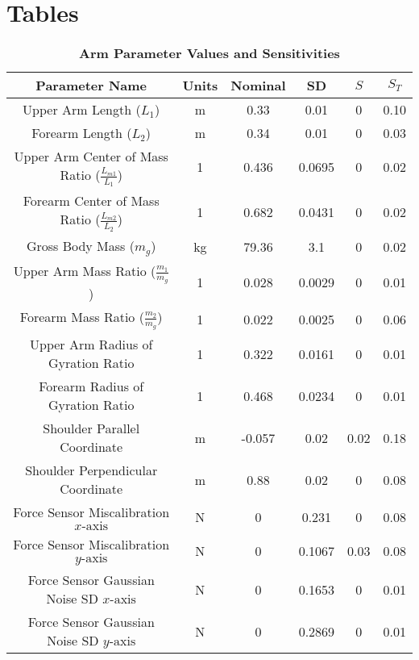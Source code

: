 \documentclass[10pt]{article}
\begin{document}
\section*{Tables}

\begin{table}[!ht]
\caption{
\bf{Arm Parameter Values and Sensitivities}}
\begin{tabular}{|c|c|c c|c c|}
\hline
Parameter Name &
Units &
Nominal &
SD &
$S$ &
$S_T$ \\ \hline
Upper Arm Length ($L_1$) &
m &
0.33 &
0.01 &
0 &
0.10 \\
Forearm Length ($L_2$) &
m &
0.34 &
0.01 &
0 &
0.03 \\
Upper Arm Center of Mass Ratio ($\frac{L_{m1}}{L_1}$) &
1 &
0.436 &
0.0695 &
0 &
0.02 \\
Forearm Center of Mass Ratio ($\frac{L_{m2}}{L_2}$) &
1 &
0.682 &
0.0431 &
0 &
0.02 \\
Gross Body Mass ($m_g$) &
kg &
79.36 &
3.1 &
0 &
0.02 \\
Upper Arm Mass Ratio ($\frac{m_1}{m_g}$) &
1 &
0.028 &
0.0029 &
0 &
0.01 \\
Forearm Mass Ratio ($\frac{m_2}{m_g}$) &
1 &
0.022 &
0.0025 &
0 &
0.06 \\
Upper Arm Radius of Gyration Ratio &
1 &
0.322 &
0.0161 &
0 &
0.01 \\
Forearm Radius of Gyration Ratio &
1 &
0.468 &
0.0234 &
0 &
0.01 \\
Shoulder Parallel Coordinate &
m &
-0.057 &
0.02 &
0.02 &
0.18 \\
Shoulder Perpendicular Coordinate &
m &
0.88 &
0.02 &
0 &
0.08 \\
Force Sensor Miscalibration $x\text{-axis}$ &
N &
0 &
0.231 &
0 &
0.08 \\
Force Sensor Miscalibration $y\text{-axis}$ &
N &
0 &
0.1067 &
0.03 &
0.08 \\
Force Sensor Gaussian Noise SD $x\text{-axis}$ &
N &
0 &
0.1653 &
0 &
0.01 \\
Force Sensor Gaussian Noise SD $y\text{-axis}$ &
N &
0 &
0.2869 &
0 &
0.01 \\

\end{tabular}
\end{table}
\end{document}
